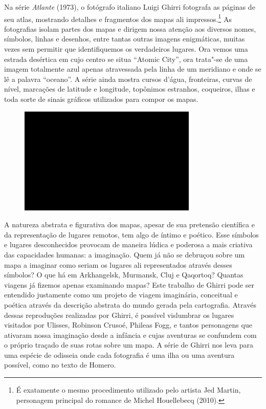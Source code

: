 Na série \emph{Atlante} (1973), o fotógrafo italiano Luigi Ghirri
fotografa as páginas de seu atlas, mostrando detalhes e fragmentos dos
mapas ali impressos.\footnote{É exatamente o mesmo procedimento utilizado
  pelo artista Jed Martin, personagem principal do romance de Michel
  Houellebecq {} (2010).} As fotografias
isolam partes dos mapas e dirigem nossa atenção aos diversos nomes,
símbolos, linhas e desenhos, entre tantas outras imagens enigmáticas,
muitas vezes sem permitir que identifiquemos os verdadeiros lugares. Ora
vemos uma estrada desértica em cujo centro se situa ``Atomic City'', ora
trata"-se de uma imagem totalmente azul apenas atravessada pela linha de
um meridiano e onde se lê a palavra ``oceano''. A série ainda mostra
cursos d'água, fronteiras, curvas de nível, marcações de latitude e
longitude, topônimos estranhos, coqueiros, ilhas e toda sorte de sinais
gráficos utilizados para compor os mapas.

\begin{figure}[!ht]

\centering
 \includegraphics[width=85mm]{./imgs/im1.jpg}
\caption{\tiny{}}

\end{figure}

A natureza abstrata e figurativa dos mapas, apesar de sua pretensão
científica e da representação de lugares remotos, tem algo de íntimo e
poético. Esse símbolos e lugares desconhecidos provocam de maneira
lúdica e poderosa a mais criativa das capacidades humanas: a imaginação.
Quem já não se debruçou sobre um mapa a imaginar como seriam os lugares
ali representados através desses símbolos? O que há em Arkhangelsk,
Murmansk, Cluj e Qaqortoq? Quantas viagens já fizemos apenas examinando
mapas? Este trabalho de Ghirri pode ser entendido justamente como um
projeto de viagem imaginária, conceitual e poética através da descrição
abstrata do mundo gerada pela cartografia. Através dessas reproduções
realizadas por Ghirri, é possível vislumbrar os lugares visitados por
Ulisses, Robinson Crusoé, Phileas Fogg, e tantos personagens que
ativaram nossa imaginação desde a infância e cujas aventuras se
confundem com o próprio traçado de suas rotas sobre um mapa. A série de
Ghirri nos leva para uma espécie de odisseia onde cada fotografia é uma ilha ou uma aventura possível, como no texto de Homero.

